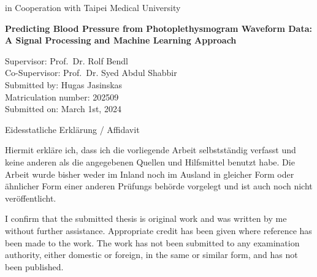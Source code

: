 \documentclass[12pt, bibliography=totoc]{scrartcl}
\begin{document}
\begin{titlepage}
\begin{center}
            \vspace{0.5cm}
            \Large
            in Cooperation with Taipei Medical University

            \hrulefill

            \vspace{1cm}

            \Huge
            \textbf{Predicting Blood Pressure from Photoplethysmogram Waveform Data: A Signal Processing and
            Machine Learning Approach}

        \end{center}

        \vfill
        \Large
        \noindent
        Supervisor: \tab\hspace{-1cm} Prof.\ Dr. Rolf Bendl\\
        Co-Supervisor: \tab\hspace{-1cm} Prof.\ Dr. Syed Abdul Shabbir\\
        Submitted by: \tab\hspace{-1cm} Hugas Jasinskas\\
        Matriculation number: \tab\hspace{-1cm} 202509\\
        Submitted on: \tab\hspace{-1cm} March 1st, 2024\\

    \end{titlepage}

    \newpage

    \begin{Huge}
        \centerline{Eidesstatliche Erklärung / Affidavit}
    \end{Huge}

    \vspace{2cm}

    \begin{Large}

        Hiermit erkläre ich, dass ich die vorliegende Arbeit selbst\-ständig verfasst und keine anderen als die angegebenen Quellen und Hilfsmittel benutzt habe.
        Die Arbeit wurde bisher weder im Inland noch im Ausland in gleicher Form oder ähnlicher Form einer anderen Prüfungs behörde vor\-gelegt und ist auch noch nicht veröffentlicht.

        \vspace{1cm}

        I confirm that the submitted thesis is original work and was written by me without further assistance.
        Appro\-priate credit has been given where reference has been made to the work.
        The work has not been submitted to any examination authority, either domestic or foreign, in the same or similar form, and has not been published.

    \end{Large}
\end{document}
